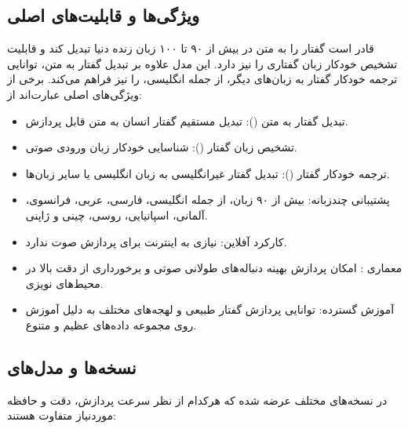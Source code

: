 \documentclass{article}
\begin{document}
\subsection{ویژگی‌ها و قابلیت‌های اصلی }
 قادر است گفتار را به متن در بیش از ۹۰ تا ۱۰۰ زبان زنده دنیا تبدیل کند و قابلیت تشخیص خودکار زبان گفتاری را نیز دارد.
این مدل علاوه بر تبدیل گفتار به متن، توانایی ترجمه خودکار گفتار به زبان‌های دیگر، از جمله انگلیسی، را نیز فراهم می‌کند.
برخی از ویژگی‌های اصلی  عبارت‌اند از:
\begin{itemize}
\item تبدیل گفتار به متن (): تبدیل مستقیم گفتار انسان به متن قابل پردازش.

\item تشخیص زبان گفتار (): شناسایی خودکار زبان ورودی صوتی.

\item ترجمه خودکار گفتار (): تبدیل گفتار غیرانگلیسی به زبان انگلیسی یا سایر زبان‌ها.

\item پشتیبانی چندزبانه: بیش از ۹۰ زبان، از جمله انگلیسی، فارسی، عربی، فرانسوی، آلمانی، اسپانیایی، روسی، چینی و ژاپنی.

\item کارکرد آفلاین: نیازی به اینترنت برای پردازش صوت ندارد.

\item معماری : امکان پردازش بهینه دنباله‌های طولانی صوتی و برخورداری از دقت بالا در محیط‌های نویزی.

\item آموزش گسترده: توانایی پردازش گفتار طبیعی و لهجه‌های مختلف به دلیل آموزش روی مجموعه داده‌های عظیم و متنوع.

\end{itemize}

\subsection{نسخه‌ها و مدل‌های }
 در نسخه‌های مختلف عرضه شده که هرکدام از نظر سرعت پردازش، دقت و حافظه موردنیاز متفاوت هستند:
\end{document}
